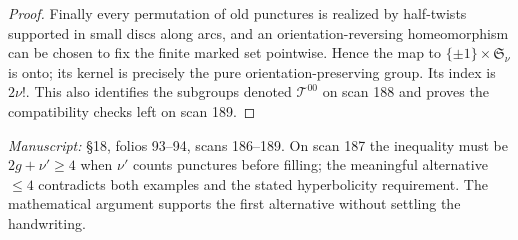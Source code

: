 \begin{proof}
Finally every permutation of old punctures is realized by half-twists supported in small discs along arcs, and an orientation-reversing homeomorphism can be chosen to fix the finite marked set pointwise. Hence the map to $\{\pm1\}\times\mathfrak S_\nu$ is onto; its kernel is precisely the pure orientation-preserving group. Its index is $2\nu!$. This also identifies the subgroups denoted $\mathcal T^{00}$ on scan 188 and proves the compatibility checks left on scan 189.
\end{proof}
\noindent\emph{Manuscript:} \S18, folios 93--94, scans 186--189. On scan 187 the inequality must be $2g+\nu'\ge4$ when $\nu'$ counts punctures before filling; the meaningful alternative $\le4$ contradicts both examples and the stated hyperbolicity requirement. The mathematical argument supports the first alternative without settling the handwriting.

